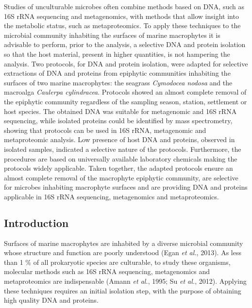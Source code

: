 \documentclass[
  12pt,
]{article}
\begin{document}
Studies of unculturable microbes often combine methods based on DNA,
such as 16S rRNA sequencing and metagenomics, with methods that allow
insight into the metabolic status, such as metaproteomics. To apply
these techniques to the microbial community inhabiting the surfaces of
marine macrophytes it is advisable to perform, prior to the analysis, a
selective DNA and protein isolation so that the host material, present
in higher quantities, is not hampering the analysis. Two protocols, for
DNA and protein isolation, were adapted for selective extractions of DNA
and proteins from epiphytic communities inhabiting the surfaces of two
marine macrophytes: the seagrass \emph{Cymodocea nodosa} and the
macroalga \emph{Caulerpa cylindracea}. Protocols showed an almost
complete removal of the epiphytic community regardless of the sampling
season, station, settlement or host species. The obtained DNA was
suitable for metagenomic and 16S rRNA sequencing, while isolated
proteins could be identified by mass spectrometry, showing that
protocols can be used in 16S rRNA, metagenomic and metaproteomic
analysis. Low presence of host DNA and proteins, observed in isolated
samples, indicated a selective nature of the protocols. Furthermore, the
procedures are based on universally available laboratory chemicals
making the protocols widely applicable. Taken together, the adapted
protocols ensure an almost complete removal of the macrophyte epiphytic
community, are selective for microbes inhabiting macrophyte surfaces and
are providing DNA and proteins applicable in 16S rRNA sequencing,
metagenomics and metaproteomics.

\newpage

\hypertarget{introduction}{%
\subsection{Introduction}\label{introduction}}

Surfaces of marine macrophytes are inhabited by a diverse microbial
community whose structure and function are poorly understood (Egan
\emph{et al.}, 2013). As less than 1 \% of all prokaryotic species are
culturable, to study these organisms, molecular methods such as 16S rRNA
sequencing, metagenomics and metaproteomics are indispensable (Amann
\emph{et al.}, 1995; Su \emph{et al.}, 2012). Applying these techniques
requires an initial isolation step, with the purpose of obtaining high
quality DNA and proteins.
\end{document}

